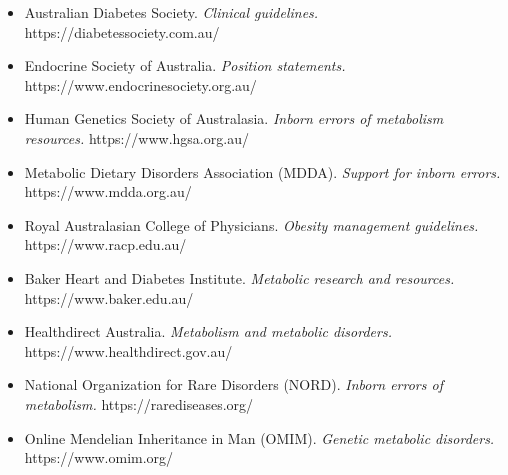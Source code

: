 \begin{itemize}
    \item Australian Diabetes Society. \textit{Clinical guidelines.} https://diabetessociety.com.au/
    \item Endocrine Society of Australia. \textit{Position statements.} https://www.endocrinesociety.org.au/
    \item Human Genetics Society of Australasia. \textit{Inborn errors of metabolism resources.} https://www.hgsa.org.au/
    \item Metabolic Dietary Disorders Association (MDDA). \textit{Support for inborn errors.} https://www.mdda.org.au/
    \item Royal Australasian College of Physicians. \textit{Obesity management guidelines.} https://www.racp.edu.au/
    \item Baker Heart and Diabetes Institute. \textit{Metabolic research and resources.} https://www.baker.edu.au/
    \item Healthdirect Australia. \textit{Metabolism and metabolic disorders.} https://www.healthdirect.gov.au/
    \item National Organization for Rare Disorders (NORD). \textit{Inborn errors of metabolism.} https://rarediseases.org/
    \item Online Mendelian Inheritance in Man (OMIM). \textit{Genetic metabolic disorders.} https://www.omim.org/
\end{itemize}